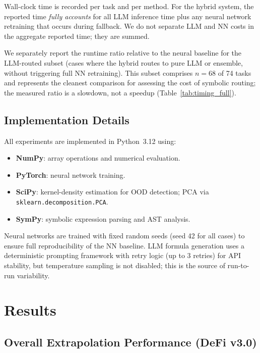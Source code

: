 \documentclass[twoside,11pt]{article}
\begin{document}
Wall-clock time is recorded per task and per method.  For the hybrid system,
the reported time \emph{fully accounts} for all LLM inference time plus any
neural network retraining that occurs during fallback.  We do not separate
LLM and NN costs in the aggregate reported time; they are summed.

We separately report the runtime ratio relative to the neural baseline for the
LLM-routed subset (cases where the hybrid routes to pure LLM or ensemble,
without triggering full NN retraining). This subset comprises $n=68$ of 74 tasks
and represents the cleanest comparison for assessing the cost of symbolic
routing; the measured ratio is a slowdown, not a speedup (Table~\ref{tab:timing_full}).

\subsection{Implementation Details}\label{subsec:implementation-details}
\label{sec:setup_impl}

All experiments are implemented in Python~3.12 using:
\begin{itemize}
  \item \textbf{NumPy}: array operations and numerical evaluation.
  \item \textbf{PyTorch}: neural network training.
  \item \textbf{SciPy}: kernel-density estimation for OOD detection; PCA via
    \texttt{sklearn.decomposition.PCA}.
  \item \textbf{SymPy}: symbolic expression parsing and AST analysis.
\end{itemize}

Neural networks are trained with fixed random seeds (seed 42 for all cases) to
ensure full reproducibility of the NN baseline.  LLM formula generation uses a
deterministic prompting framework with retry logic (up to 3 retries) for API
stability, but temperature sampling is not disabled; this is the source of
run-to-run variability.

\section{Results}
\label{sec:results}

\subsection{Overall Extrapolation Performance (DeFi v3.0)}\label{subsec:overall-extrapolation-performance-defi-v}
\label{sec:results_defi}
\end{document}
